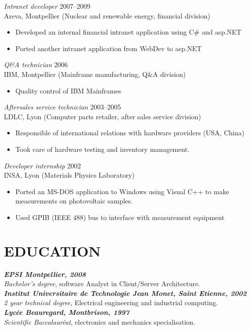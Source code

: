 \documentclass[line,resmargin]{res}
\begin{document}
\begin{resume}
{\sl Intranet developer\/} \hfill 2007--2009 \\
Areva, Montpellier (Nuclear and renewable energy, financial division)
\begin{itemize} \itemsep -2pt
    \item Developed an internal financial intranet application using C\# and asp.NET
    \item Ported another intranet application from WebDev to asp.NET
\end{itemize}

{\sl Q\&A technician\/} \hfill 2006 \\
IBM, Montpellier (Mainframe manufacturing, Q\&A division)
\begin{itemize}  \itemsep -2pt
    \item Quality control of IBM Mainframes
\end{itemize}

{\sl Aftersales service technician\/} \hfill     2003--2005 \\
LDLC, Lyon (Computer parts retailer, after sales service division)
\begin{itemize}  \itemsep -2pt
    \item Responsible of international relations with hardware providers (USA, China)
    \item Took care of hardware testing and inventory management.
\end{itemize}

{\sl Developer internship\/} \hfill 2002 \\
INSA, Lyon (Materials Physics Laboratory)
\begin{itemize} \itemsep -2pt
    \item Ported an MS-DOS application to Windows using Visual C++ to make
    measurements on photovoltaic samples.
    \item Used GPIB (IEEE 488) bus to interface with measurement equipment
\end{itemize}

\section{EDUCATION}
{\sl \textbf{EPSI Montpellier, 2008}\\
Bachelor's degree}, software Analyst in Client/Server Architecture.\\
{\sl \textbf{Institut Universitaire de Technologie Jean Monet, Saint Etienne, 2002}\\
2 year technical degree}, Electrical engineering and  industrial computing.\\
{\sl \textbf{Lyc\'{e}e Beauregard, Montbrison, 1997} \\
Scientific Baccalaur\'{e}at}, electronics and mechanics specialisation.


\end{resume}
\end{document}
